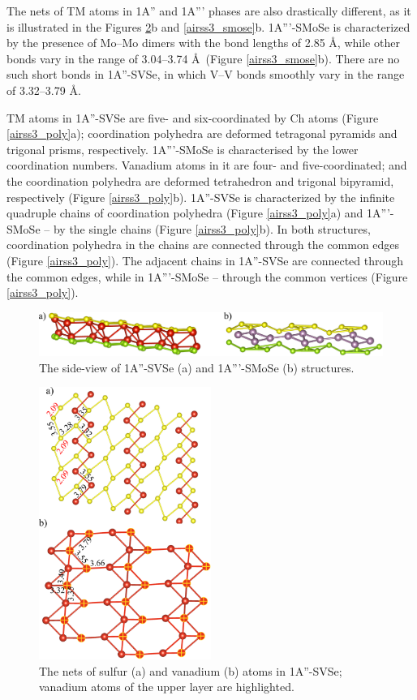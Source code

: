 \documentclass[a4paperm]{article}
\begin{document}
The nets of TM atoms in 1A'' and 1A''' phases are also drastically different, as it is illustrated in the Figures \ref{airss3_svse}b and \ref{airss3_smose}b.
1A'''-SMoSe is characterized by the presence of Mo--Mo dimers with the bond lengths of 2.85 \AA, while other bonds vary in the range of 3.04--3.74 \AA\ (Figure \ref{airss3_smose}b).
There are no such short bonds in 1A''-SVSe, in which V--V bonds smoothly vary in the range of 3.32--3.79 \AA.

TM atoms in 1A''-SVSe are five- and six-coordinated by Ch atoms (Figure \ref{airss3_poly}a);
coordination polyhedra are deformed tetragonal pyramids and trigonal prisms, respectively.
1A'''-SMoSe is characterised by the lower coordination numbers.
Vanadium atoms in it are four- and five-coordinated; and the coordination polyhedra are deformed tetrahedron and trigonal bipyramid, respectively (Figure \ref{airss3_poly}b).
1A''-SVSe is characterized by the infinite quadruple chains of coordination polyhedra (Figure \ref{airss3_poly}a) and 1A'''-SMoSe -- by the single chains (Figure \ref{airss3_poly}b).
In both structures, coordination polyhedra in the chains are connected through the common edges (Figure \ref{airss3_poly}).
The adjacent chains in 1A''-SVSe are connected through the common edges, while in 1A'''-SMoSe -- through the common vertices (Figure \ref{airss3_poly}).

\begin{figure}[H]
	\includegraphics[width=\textwidth]{airss3_side.png}
	\caption{The side-view of 1A''-SVSe (a) and 1A'''-SMoSe (b) structures.}
	\label{airss3_side}
\end{figure}

\begin{figure}[H]
	\includegraphics[width=0.5\textwidth]{airss3_svse.png}
	\caption{The nets of sulfur (a) and vanadium (b) atoms in 1A''-SVSe; vanadium atoms of the upper layer are highlighted.}
	\label{airss3_svse}
\end{figure}
\end{document}
